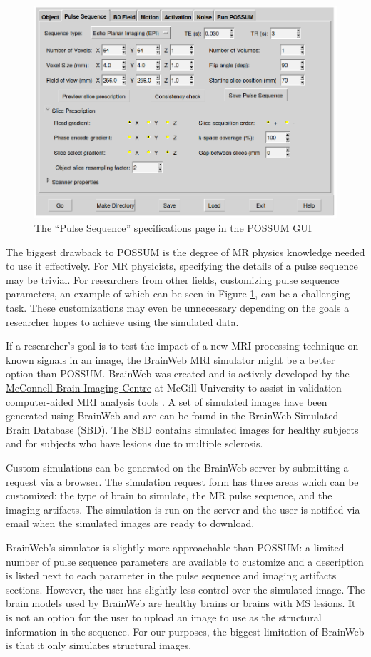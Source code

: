 \begin{figure}
\centering
\includegraphics[width=.6\textwidth]{7/possum-gui.png}
\caption{The ``Pulse Sequence'' specifications page in the POSSUM GUI}
\label{fig:possum}
\end{figure}

The biggest drawback to POSSUM is the degree of MR physics knowledge needed to use it effectively. For MR physicists, specifying the details of a pulse sequence may be trivial. For researchers from other fields, customizing pulse sequence parameters, an example of which can be seen in Figure \ref{fig:possum}, can be a challenging task. These customizations may even be unnecessary depending on the goals a researcher hopes to achieve using the simulated data.

If a researcher's goal is to test the impact of a new MRI processing technique on known signals in an image, the BrainWeb MRI simulator might be a better option than POSSUM. BrainWeb was created and is actively developed by the \href{mcgill.ca/bic/}{McConnell Brain Imaging Centre} at McGill University to assist in validation computer-aided MRI analysis tools \cite{kwan1999mri} \cite{collins1998design} \cite{cocosco1997brainweb} \cite{kwan1996extensible}. A set of simulated images have been generated using BrainWeb and are can be found in the BrainWeb Simulated Brain Database (SBD). The SBD contains simulated images for healthy subjects and for subjects who have lesions due to multiple sclerosis.

Custom simulations can be generated on the BrainWeb server by submitting a request via a browser. The simulation request form has three areas which can be customized: the type of brain to simulate, the MR pulse sequence, and the imaging artifacts. The simulation is run on the server and the user is notified via email when the simulated images are ready to download. 

BrainWeb's simulator is slightly more approachable than POSSUM: a limited number of pulse sequence parameters are available to customize and a description is listed next to each parameter in the pulse sequence and imaging artifacts sections. However, the user has slightly less control over the simulated image. The brain models used by BrainWeb are healthy brains or brains with MS lesions. It is not an option for the user to upload an image to use as the structural information in the sequence. For our purposes, the biggest limitation of BrainWeb is that it only simulates structural images. 

